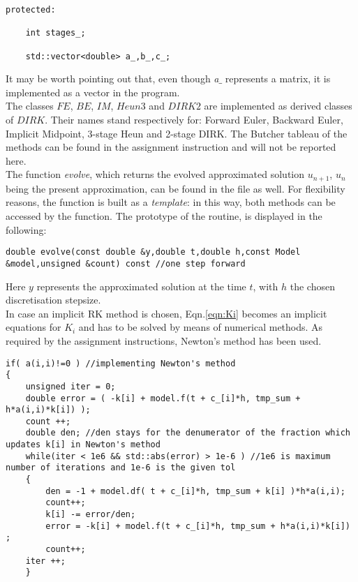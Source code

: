 \documentclass[11pt]{article}
\theoremstyle{theorem}
\theoremstyle{definition}
\begin{document}
\begin{lstlisting}
protected:

	int stages_;

	std::vector<double> a_,b_,c_;
\end{lstlisting}

It may be worth pointing out that, even though \emph{a$\_$} represents a matrix, it is implemented as a vector in the program.\\
The classes $FE$, $BE$, $IM$, $Heun3$ and $DIRK2$ are implemented as derived classes of $DIRK$. Their names stand respectively for: Forward Euler, Backward Euler, Implicit Midpoint, 3-stage Heun and 2-stage DIRK. The Butcher tableau of the methods can be found in the assignment instruction and will not be reported here.\\


The function \emph{evolve}, which returns the evolved approximated solution $u_{n+1}$, $u_n$ being the present approximation, can be found in the file as well. For flexibility reasons, the function is built as a \emph{template}: in this way, both methods can be accessed by the function. The prototype of the routine, is displayed in the following:

\begin{lstlisting}
double evolve(const double &y,double t,double h,const Model &model,unsigned &count) const //one step forward
\end{lstlisting}

Here $y$ represents the approximated solution at the time $t$, with $h$ the chosen discretisation stepsize.\\
In case an implicit RK method is chosen, Eqn.\ref{eqn:Ki} becomes an implicit equations for $K_i$ and has to be solved by means of numerical methods. As required by the assignment instructions, Newton's method has been used.\\

\begin{lstlisting}
if( a(i,i)!=0 ) //implementing Newton's method
{
	unsigned iter = 0;
	double error = ( -k[i] + model.f(t + c_[i]*h, tmp_sum + h*a(i,i)*k[i]) );
	count ++;
	double den; //den stays for the denumerator of the fraction which updates k[i] in Newton's method
	while(iter < 1e6 && std::abs(error) > 1e-6 ) //1e6 is maximum number of iterations and 1e-6 is the given tol
	{
		den = -1 + model.df( t + c_[i]*h, tmp_sum + k[i] )*h*a(i,i);
		count++;
		k[i] -= error/den;
		error = -k[i] + model.f(t + c_[i]*h, tmp_sum + h*a(i,i)*k[i]) ;
		count++;
	iter ++;
	}
\end{lstlisting}
\end{document}
